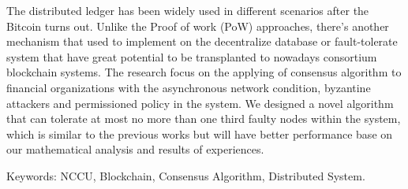 \begin{abstracten}
The distributed ledger has been widely used in different scenarios after the Bitcoin turns out.
Unlike the Proof of work (PoW) approaches, there’s another mechanism that used to implement on the decentralize database or fault-tolerate system that have great potential to be transplanted to nowadays consortium blockchain systems.
The research focus on the applying of consensus algorithm to financial organizations with the asynchronous network condition, byzantine attackers and permissioned policy in the system.
We designed a novel algorithm that can tolerate at most no more than one third faulty nodes within the system, which is similar to the previous works but will have better performance base on our mathematical analysis and results of experiences.\\

\noindent

\vspace{\fill}
Keywords: NCCU, Blockchain, Consensus Algorithm, Distributed System. 
\end{abstracten}
